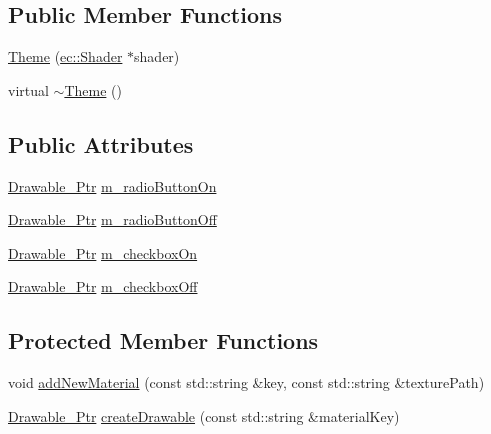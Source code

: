 \subsection*{Public Member Functions}
\begin{DoxyCompactItemize}
\item 
\mbox{\hyperlink{classec__gui_1_1_theme_ad0a0cf74a37307bdb2cc12672f2649d4}{Theme}} (\mbox{\hyperlink{classec_1_1_shader}{ec\+::\+Shader}} $\ast$shader)
\item 
virtual \mbox{\hyperlink{classec__gui_1_1_theme_a49f870526859d679091067ee73e9881e}{$\sim$\+Theme}} ()
\end{DoxyCompactItemize}
\subsection*{Public Attributes}
\begin{DoxyCompactItemize}
\item 
\mbox{\hyperlink{classec__gui_1_1_theme_aa831418117dca2cf1b0c390bd0da97c1}{Drawable\+\_\+\+Ptr}} \mbox{\hyperlink{classec__gui_1_1_theme_a32ec365be4eb0c808efcf0d08ae9c07d}{m\+\_\+radio\+Button\+On}}
\item 
\mbox{\hyperlink{classec__gui_1_1_theme_aa831418117dca2cf1b0c390bd0da97c1}{Drawable\+\_\+\+Ptr}} \mbox{\hyperlink{classec__gui_1_1_theme_a82a501e3c636a5873012840251ef4493}{m\+\_\+radio\+Button\+Off}}
\item 
\mbox{\hyperlink{classec__gui_1_1_theme_aa831418117dca2cf1b0c390bd0da97c1}{Drawable\+\_\+\+Ptr}} \mbox{\hyperlink{classec__gui_1_1_theme_a49c2976f9ccb512414836cbd0711dc1c}{m\+\_\+checkbox\+On}}
\item 
\mbox{\hyperlink{classec__gui_1_1_theme_aa831418117dca2cf1b0c390bd0da97c1}{Drawable\+\_\+\+Ptr}} \mbox{\hyperlink{classec__gui_1_1_theme_a8dd8bb49546b8b476ef71fae6d3b9ec3}{m\+\_\+checkbox\+Off}}
\end{DoxyCompactItemize}
\subsection*{Protected Member Functions}
\begin{DoxyCompactItemize}
\item 
void \mbox{\hyperlink{classec__gui_1_1_theme_a7d194364d05e4a41a64a8ff77c86780d}{add\+New\+Material}} (const std\+::string \&key, const std\+::string \&texture\+Path)
\item 
\mbox{\hyperlink{classec__gui_1_1_theme_aa831418117dca2cf1b0c390bd0da97c1}{Drawable\+\_\+\+Ptr}} \mbox{\hyperlink{classec__gui_1_1_theme_a8ce73f24f75e1ef74b02f0f55be07c2e}{create\+Drawable}} (const std\+::string \&material\+Key)
\end{DoxyCompactItemize}
